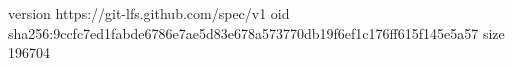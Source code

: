 version https://git-lfs.github.com/spec/v1
oid sha256:9ccfc7ed1fabde6786e7ae5d83e678a573770db19f6ef1c176ff615f145e5a57
size 196704
